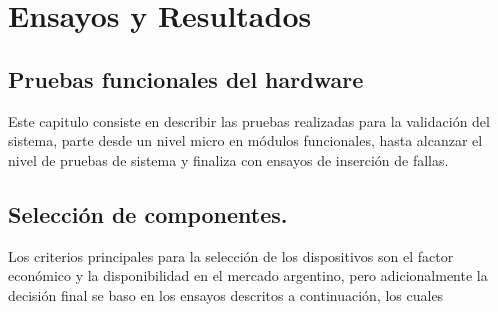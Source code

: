 
\chapter{Ensayos y Resultados} %

\label{Chapter4} %


\section{Pruebas funcionales del hardware}
\label{sec:pruebasHW}

Este capitulo consiste en describir las pruebas realizadas para la validación del sistema, parte desde un nivel micro en módulos funcionales,  hasta alcanzar el nivel de pruebas de sistema y finaliza con ensayos de inserción de fallas. 

\section{Selección de componentes.}

Los criterios principales para la selección de los dispositivos son el factor económico y  la disponibilidad en el mercado argentino, pero adicionalmente la decisión final se baso en los ensayos descritos a continuación, los cuales 



